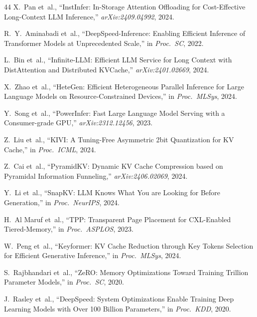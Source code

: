 \documentclass[conference]{IEEEtran}
\begin{document}
\begin{thebibliography}{44}
 X.~Pan et~al., ``InstInfer: In-Storage Attention Offloading for Cost-Effective Long-Context LLM Inference,'' \textit{arXiv:2409.04992}, 2024.

 R.~Y.~Aminabadi et~al., ``DeepSpeed-Inference: Enabling Efficient Inference of Transformer Models at Unprecedented Scale,'' in \textit{Proc.\ SC}, 2022.

 L.~Bin et~al., ``Infinite-LLM: Efficient LLM Service for Long Context with DistAttention and Distributed KVCache,'' \textit{arXiv:2401.02669}, 2024.

 X.~Zhao et~al., ``HeteGen: Efficient Heterogeneous Parallel Inference for Large Language Models on Resource-Constrained Devices,'' in \textit{Proc.\ MLSys}, 2024.

 Y.~Song et~al., ``PowerInfer: Fast Large Language Model Serving with a Consumer-grade GPU,'' \textit{arXiv:2312.12456}, 2023.

 Z.~Liu et~al., ``KIVI: A Tuning-Free Asymmetric 2bit Quantization for KV Cache,'' in \textit{Proc.\ ICML}, 2024.

 Z.~Cai et~al., ``PyramidKV: Dynamic KV Cache Compression based on Pyramidal Information Funneling,'' \textit{arXiv:2406.02069}, 2024.

 Y.~Li et~al., ``SnapKV: LLM Knows What You are Looking for Before Generation,'' in \textit{Proc.\ NeurIPS}, 2024.

 H.~Al Maruf et~al., ``TPP: Transparent Page Placement for CXL-Enabled Tiered-Memory,'' in \textit{Proc.\ ASPLOS}, 2023.

 W.~Peng et~al., ``Keyformer: KV Cache Reduction through Key Tokens Selection for Efficient Generative Inference,'' in \textit{Proc.\ MLSys}, 2024.

 S.~Rajbhandari et~al., ``ZeRO: Memory Optimizations Toward Training Trillion Parameter Models,'' in \textit{Proc.\ SC}, 2020.

 J.~Rasley et~al., ``DeepSpeed: System Optimizations Enable Training Deep Learning Models with Over 100 Billion Parameters,'' in \textit{Proc.\ KDD}, 2020.

\end{thebibliography}
\end{document}
